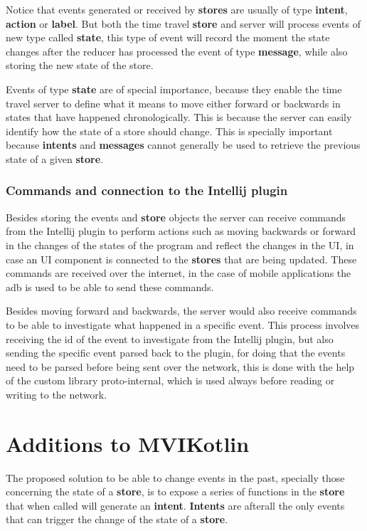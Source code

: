 Notice that events generated or received by \textbf{stores} are usually of type \textbf{intent}, \textbf{action} or \textbf{label}. But both the time travel \textbf{store} and server will process events of new type called \textbf{state}, this type of event will record the moment the state changes after the reducer has processed the event of type \textbf{message}, while also storing the new state of the store.

Events of type \textbf{state} are of special importance, because they enable the time travel server to define what it means to move either forward or backwards in states that have happened chronologically. This is because the server can easily identify how the state of a store should change. This is specially important because \textbf{intents} and \textbf{messages} cannot generally be used to retrieve the previous state of a given \textbf{store}.

\subsubsection{Commands and connection to the Intellij plugin}

Besides storing the events and \textbf{store} objects the server can receive commands from the Intellij plugin to perform actions such as moving backwards or forward in the changes of the states of the program and reflect the changes in the UI, in case an UI component is connected to the \textbf{stores} that are being updated. These commands are received over the internet, in the case of mobile applications the adb is used to be able to send these commands.

Besides moving forward and backwards, the server would also receive commands to be able to investigate what happened in a specific event. This process involves receiving the id of the event to investigate from the Intellij plugin, but also sending the specific event parsed back to the plugin, for doing that the events need to be parsed before being sent over the network, this is done with the help of the custom library proto-internal, which is used always before reading or writing to the network.

\section{Additions to MVIKotlin}

The proposed solution to be able to change events in the past, specially those concerning the state of a \textbf{store}, is to expose a series of functions in the \textbf{store} that when called will generate an \textbf{intent}. \textbf{Intents} are afterall the only events that can trigger the change of the state of a \textbf{store}.

